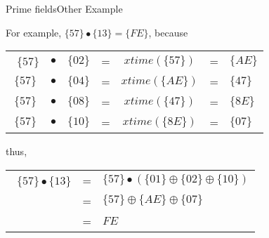 \begin{frame}[t]{Prime fields}{Other Example}
	
	For example, $\{57\} \bullet \{13\} = \{FE\}$, because 
	\medskip
	
	
	\begin{center}
		\small
		\begin{tabular}{ccccccl}\
			$\{57\}$ & $\bullet$ & $\{02\}$ & = &  $xtime(\{57\})$ & = & $\{AE\}$ \\
			$\{57\}$ & $\bullet$ & $\{04\}$ & = &  $xtime(\{AE\})$ & = & $\{47\}$ \\
			$\{57\}$ & $\bullet$ & $\{08\}$ & = &  $xtime(\{47\})$ & = & $\{8E\}$ \\
			$\{57\}$ & $\bullet$ & $\{10\}$ & = &  $xtime(\{8E\})$ & = & $\{07\}$ \\

	\end{tabular}\end{center}
	
	thus,
	
	\begin{center}
		\small
		\begin{tabular}{ccl}\
			$\{57\} \bullet \{13\}$ & = &  $\{57\} \bullet (\{01\} \oplus \{02\} \oplus \{10\})$ \\
			& = & $\{57\} \oplus \{AE\} \oplus \{07\}$ \\
			& = &  $FE$ \\
			
	\end{tabular}\end{center}
\end{frame}
